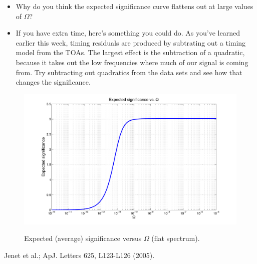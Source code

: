 \documentclass[prd,floatfix,preprintnumbers,amsmath,amssymb,nofootinbib,superscriptaddress]{revtex4}
\begin{document}
\begin{itemize}
\item Why do you think the expected significance curve flattens out at large values of $\Omega$?

\item If you have extra time, here's something you could do.  As you've learned earlier this 
week, timing residuals are produced by subtrating out a timing model from the TOAs. 
The largest effect is the subtraction of a quadratic, because it takes out the low frequencies 
where much of our signal is coming from. Try subtracting out quadratics from the data sets 
and see how that changes the significance.

\end{itemize}

\begin{figure}[h]
\includegraphics[width=20cm]{ExpectedSignificance}\\
\caption{Expected (average) significance versus $\Omega$ (flat spectrum).}
\end{figure}


\begin{thebibliography}{}

 Jenet et al.; ApJ. Letters 625, L123-L126 (2005).

\end{thebibliography}
\end{document}
